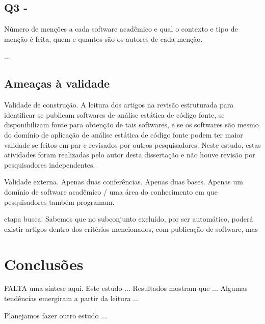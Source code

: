 
\subsection{Q3 - \EstudoUmQuestaoTres} %

Número de menções a cada software acadêmico e qual o contexto e tipo de menção
é feita, quem e quantos são os autores de cada menção.

...



\subsection{Ameaças à validade}

Validade de construção.
A leitura dos artigos na revisão estruturada para identificar se publicam
softwares de análise estática de código fonte, se disponibilizam fonte para
obtenção de tais softwares, e se os softwares são mesmo do domínio de aplicação
de análise estática de código fonte podem ter maior validade se feitos em
par e revisados por outros pesquisadores.
Neste estudo, estas atividades foram realizadas pelo autor desta dissertação e 
não houve revisão por pesquisadores independentes.

Validade externa. Apenas duas conferências. Apenas duas bases. Apenas um domínio de software acadêmico / uma área do conhecimento em que pesquisadores também programam.

etapa busca: Sabemos que no subconjunto excluído, por ser automático, poderá existir artigos
dentro dos critérios mencionados, com publicação de software, mas 

\section{Conclusões} \label{estudo1:conclusoes}

FALTA uma síntese aqui. 
Este estudo ...
Resultados mostram que ...
Algumas tendências emergiram a partir da leitura ...

Planejamos fazer outro estudo ... 
